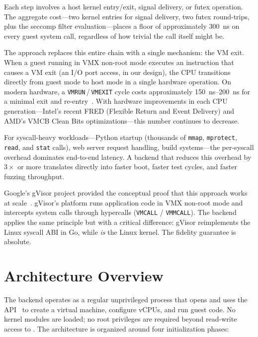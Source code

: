 Each step involves a host kernel entry/exit, signal delivery, or futex
operation.  The aggregate cost---two kernel entries for signal delivery, two
futex round-trips, plus the seccomp filter evaluation---places a floor of
approximately \SI{300}{\nano\second} on every guest system call, regardless
of how trivial the call itself might be.

The \KVM{} approach replaces this entire chain with a single mechanism: the
VM exit.  When a guest running in VMX non-root mode executes an instruction
that causes a VM exit (an I/O port access, in our design), the CPU
transitions directly from guest mode to host mode in a single hardware
operation.  On modern hardware, a \texttt{VMRUN}\,/\,\texttt{VMEXIT} cycle
costs approximately \SIrange{150}{200}{\nano\second} for a minimal exit and
re-entry~\cite{kivity2007, intel-sdm}.  With hardware improvements in each
CPU generation---Intel's recent FRED (Flexible Return and Event Delivery)
and AMD's VMCB Clean Bits optimizations---this number continues to
decrease.

For syscall-heavy workloads---Python startup (thousands of \texttt{mmap},
\texttt{mprotect}, \texttt{read}, and \texttt{stat} calls), web server
request handling, build systems---the per-syscall overhead dominates
end-to-end latency.  A backend that reduces this overhead by $3\times$ or
more translates directly into faster boot, faster test cycles, and faster
fuzzing throughput.

Google's gVisor project provided the conceptual proof that this approach
works at scale~\cite{gvisor-platforms}.  gVisor's \KVM{} platform runs
application code in VMX non-root mode and intercepts system calls through
hypercalls (\texttt{VMCALL} / \texttt{VMMCALL}).  The \UML{} \KVMvTwo{}
backend applies the same principle but with a critical difference: gVisor
reimplements the Linux syscall ABI in Go, while \UML{} \emph{is} the Linux
kernel.  The fidelity guarantee is absolute.


\section{Architecture Overview}
\label{sec:kvm-arch}

The \KVMvTwo{} backend operates as a regular unprivileged process that
opens  and uses the \KVM{} API~\cite{kvm-api} to create
a virtual machine, configure vCPUs, and run guest code.  No kernel modules
are loaded; no root privileges are required beyond read-write access to
.  The architecture is organized around four
initialization phases:

